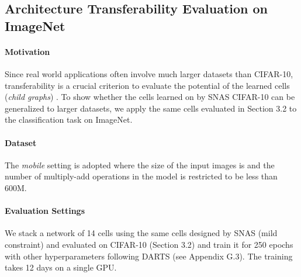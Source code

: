 \documentclass{article} \usepackage{iclr2019_conference,times}
\newcommand{\zh}{\color{black}}
\begin{document}
\subsection{Architecture Transferability Evaluation on ImageNet}

\paragraph{Motivation}

Since real world applications often involve much larger datasets than CIFAR-10, transferability is a crucial criterion to evaluate the potential of the learned cells (\textit{child graphs}) \citep{zoph2017learning}. To show whether the cells learned on by SNAS CIFAR-10 can be generalized to larger datasets, we apply the same cells evaluated in Section 3.2 to the classification task on ImageNet.

\paragraph{Dataset}

The \textit{mobile} setting is adopted where the size of the input images is  and the number of multiply-add operations in the model is restricted to be less than 600M.

\paragraph{Evaluation Settings}

We stack a network of 14 cells using the same cells designed by SNAS (mild constraint) and evaluated on CIFAR-10 (Section 3.2) and train it for {\zh 250} epochs with other hyperparameters following DARTS (see Appendix G.3). The training takes 12 days on a single GPU.
\end{document}
